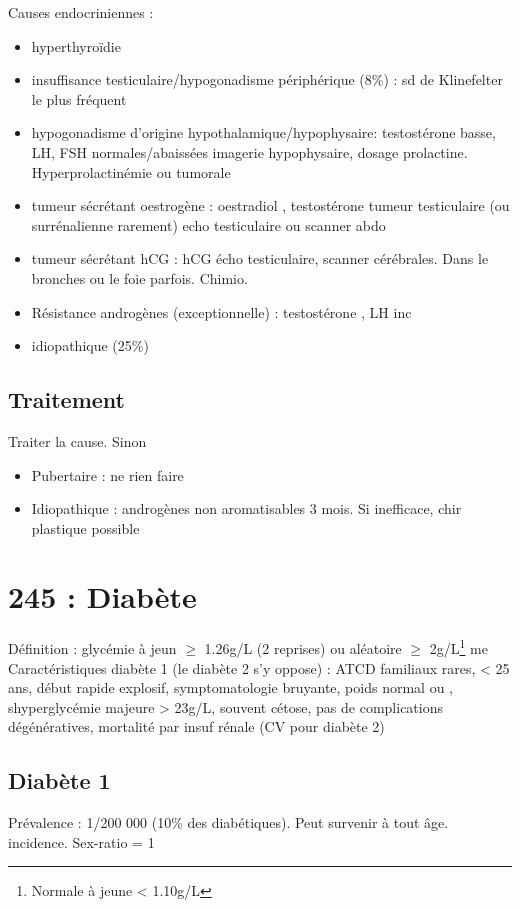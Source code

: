 \documentclass[11pt]{article}
\begin{document}
Causes endocriniennes :
\begin{itemize}
\item hyperthyroïdie
\item insuffisance testiculaire/hypogonadisme périphérique (8\%) : sd de Klinefelter
le plus fréquent
\item hypogonadisme d'origine hypothalamique/hypophysaire: testostérone basse, LH,
FSH normales/abaissées \thus imagerie hypophysaire, dosage
prolactine. Hyperprolactinémie ou tumorale
\item tumeur sécrétant oestrogène : oestradiol \inc, testostérone \dec \thus tumeur
testiculaire (ou surrénalienne rarement) \thus echo testiculaire ou scanner
abdo
\item tumeur sécrétant hCG : \inc hCG \thus écho testiculaire, scanner
cérébrales. Dans le bronches ou le foie parfois. Chimio.
\item Résistance androgènes (exceptionnelle) : testostérone \inc, LH inc
\item idiopathique (25\%)
\end{itemize}

\subsection{Traitement}
\label{sec:org4e28062}
Traiter la cause. Sinon
\begin{itemize}
\item Pubertaire : ne rien faire
\item Idiopathique : androgènes non aromatisables 3 mois. Si inefficace, chir
plastique possible
\end{itemize}
\section{245 : Diabète}
\label{sec:orgbacd2db}
Définition : glycémie à jeun \(\ge\) 1.26g/L (2 reprises) ou aléatoire \(\ge\) 2g/L\footnote{Normale à jeune < 1.10g/L}
me
Caractéristiques diabète 1 (le diabète 2 s'y oppose) : ATCD familiaux rares, <
25 ans, début rapide explosif, symptomatologie bruyante, poids normal ou \dec,
shyperglycémie majeure > 23g/L, souvent cétose, pas de complications
dégénératives, mortalité par insuf rénale (CV pour diabète 2)

\subsection{Diabète 1}
\label{sec:org31c1919}
Prévalence : 1/200 000 (10\% des diabétiques). Peut survenir à tout âge. \inc
incidence. Sex-ratio = 1
\end{document}
